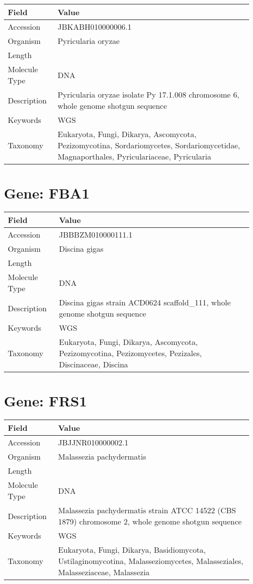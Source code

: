 \documentclass[10pt]{article}
\begin{document}
{\footnotesize
\begin{longtable}{>{\raggedright\arraybackslash}p{4.5cm} >{\raggedright\arraybackslash}p{11.5cm}}
\textbf{Field} & \textbf{Value} \\
\hline
Accession & JBKABH010000006.1 \\
Organism & Pyricularia oryzae \\
Length & 6072652 \\
Molecule Type & DNA \\
Description & Pyricularia oryzae isolate Py 17.1.008 chromosome 6, whole genome shotgun sequence \\
Keywords & WGS \\
Taxonomy & Eukaryota, Fungi, Dikarya, Ascomycota, Pezizomycotina, Sordariomycetes, Sordariomycetidae, Magnaporthales, Pyriculariaceae, Pyricularia \\
\end{longtable}
}


\section*{Gene: FBA1}
{\footnotesize
\begin{longtable}{>{\raggedright\arraybackslash}p{4.5cm} >{\raggedright\arraybackslash}p{11.5cm}}
\textbf{Field} & \textbf{Value} \\
\hline
Accession & JBBBZM010000111.1 \\
Organism & Discina gigas \\
Length & 129430 \\
Molecule Type & DNA \\
Description & Discina gigas strain ACD0624 scaffold\_111, whole genome shotgun sequence \\
Keywords & WGS \\
Taxonomy & Eukaryota, Fungi, Dikarya, Ascomycota, Pezizomycotina, Pezizomycetes, Pezizales, Discinaceae, Discina \\
\end{longtable}
}


\section*{Gene: FRS1}
{\footnotesize
\begin{longtable}{>{\raggedright\arraybackslash}p{4.5cm} >{\raggedright\arraybackslash}p{11.5cm}}
\textbf{Field} & \textbf{Value} \\
\hline
Accession & JBJJNR010000002.1 \\
Organism & Malassezia pachydermatis \\
Length & 1741169 \\
Molecule Type & DNA \\
Description & Malassezia pachydermatis strain ATCC 14522 (CBS 1879) chromosome 2, whole genome shotgun sequence \\
Keywords & WGS \\
Taxonomy & Eukaryota, Fungi, Dikarya, Basidiomycota, Ustilaginomycotina, Malasseziomycetes, Malasseziales, Malasseziaceae, Malassezia \\
\end{longtable}
}
\end{document}
